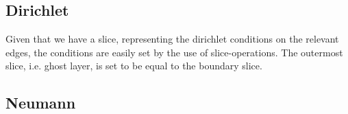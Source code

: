     \subsection{Dirichlet}
        Given that we have a slice, representing the dirichlet conditions on the relevant
        edges, the conditions are easily set by the use of slice-operations.
        The outermost slice, i.e. ghost layer, is set to be equal to the boundary slice.



    \subsection{Neumann}

